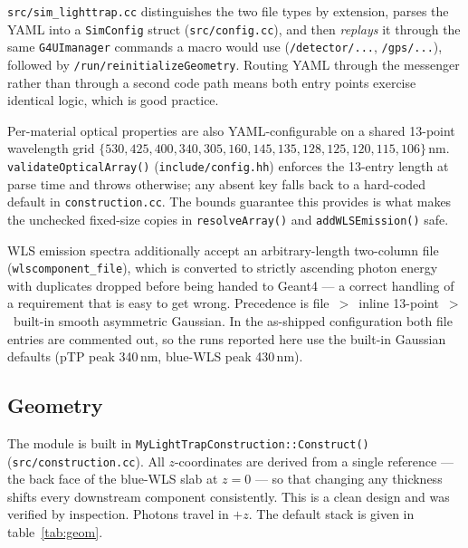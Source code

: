 \documentclass[a4paper,11pt]{article}
\begin{document}
\texttt{src/sim\_lighttrap.cc} distinguishes the two file types by extension,
parses the YAML into a \texttt{SimConfig} struct (\texttt{src/config.cc}), and
then \emph{replays} it through the same \texttt{G4UImanager} commands a macro
would use (\texttt{/detector/...}, \texttt{/gps/...}), followed by
\texttt{/run/reinitializeGeometry}. Routing YAML through the messenger rather
than through a second code path means both entry points exercise identical
logic, which is good practice.

Per-material optical properties are also YAML-configurable on a shared 13-point
wavelength grid $\{530, 425, 400, 340, 305, 160, 145, 135, 128, 125, 120, 115,
106\}$\,nm. \texttt{validateOpticalArray()} (\texttt{include/config.hh}) enforces
the 13-entry length at parse time and throws otherwise; any absent key falls
back to a hard-coded default in \texttt{construction.cc}. The bounds guarantee
this provides is what makes the unchecked fixed-size copies in
\texttt{resolveArray()} and \texttt{addWLSEmission()} safe.

WLS emission spectra additionally accept an arbitrary-length two-column file
(\texttt{wlscomponent\_file}), which is converted to strictly ascending photon
energy with duplicates dropped before being handed to Geant4 --- a correct
handling of a requirement that is easy to get wrong. Precedence is
file~$>$~inline 13-point~$>$~built-in smooth asymmetric Gaussian. In the
as-shipped configuration both file entries are commented out, so the runs
reported here use the built-in Gaussian defaults (pTP peak 340\,nm, blue-WLS
peak 430\,nm).

\subsection{Geometry}
\label{sec:geometry}

The module is built in \texttt{MyLightTrapConstruction::Construct()}
(\texttt{src/construction.cc}). All $z$-coordinates are derived from a single
reference --- the back face of the blue-WLS slab at $z=0$ --- so that changing
any thickness shifts every downstream component consistently. This is a clean
design and was verified by inspection. Photons travel in $+z$. The default stack
is given in table~\ref{tab:geom}.
\end{document}
